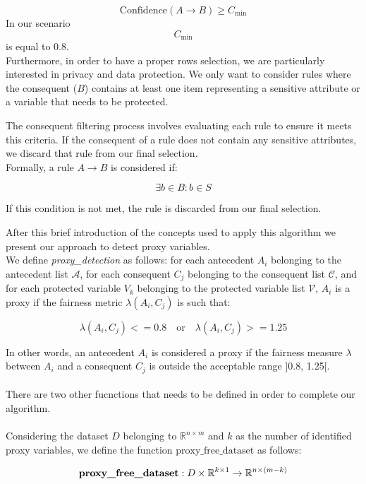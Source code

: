 \documentclass[12pt,a4paper,openright,twoside]{book}
\begin{document}
\begin{enumerate}
\[
\text{Confidence}(A \rightarrow B) \geq C_{\text{min}}
\]
In our scenario
\[
C_{\text{min}}
\]
is equal to 0.8. \\

Furthermore, in order to have a proper rows selection, we are particularly interested in privacy and data protection. We only want to consider rules where the consequent ($B$) contains at least one item representing a sensitive attribute or a variable that needs to be protected.

The consequent filtering process involves evaluating each rule to ensure it meets this criteria. If the consequent of a rule does not contain any sensitive attributes, we discard that rule from our final selection. \\

Formally, a rule $A \rightarrow B$ is considered if:

\[
\exists b \in B : b \in S
\]

If this condition is not met, the rule is discarded from our final selection.
\end{enumerate}
After this brief introduction of the concepts used to apply this algorithm we present our approach to detect proxy variables. \\
We define \textit{proxy\_detection} as follows: for each antecedent \( A_i \) belonging to the antecedent list \( \mathcal{A} \), for each consequent \( C_j \) belonging to the consequent list \( \mathcal{C} \), and for each protected variable \( V_k \) belonging to the protected variable list \( \mathcal{V} \), \( A_i \) is a proxy if the fairness metric \( \lambda(A_i, C_j) \) is such that:

\[\lambda(A_i, C_j) <= 0.8 \quad \text{or} \quad \lambda(A_i, C_j) >= 1.25\]

In other words, an antecedent \( A_i \) is considered a proxy if the fairness measure \( \lambda \) between \( A_i \) and a consequent \( C_j \) is outside the acceptable range ]0.8, 1.25[.
\\
\\
There are two other fucnctions that needs to be defined in order to complete our algorithm.
\\
\\
Considering the dataset \( D \) belonging to \( \mathbb{R}^{n \times m} \) and \( k \) as the number of identified proxy variables, we define the function \( \text{proxy\_free\_dataset} \) as follows:

\[
\text{\textbf{proxy\_free\_dataset}}: D \times \mathbb{R}^{k \times 1} \rightarrow \mathbb{R}^{n \times (m - k)}
\]
\end{document}
